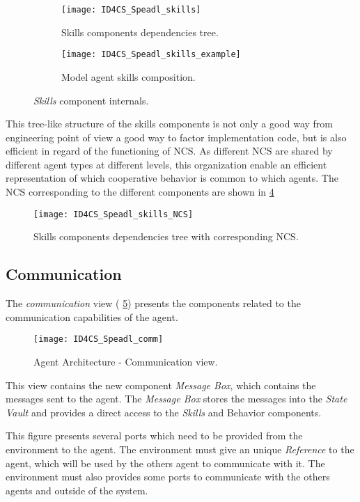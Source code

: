 \begin{figure}[]
\centering
	\begin{subfigure}[b]{0.49\textwidth}
			\texttt{[image: ID4CS\_Speadl\_skills]}
			\caption{Skills components dependencies tree.}\label{skills:graph}
	\end{subfigure}
	\begin{subfigure}[b]{0.49\textwidth}
			\texttt{[image: ID4CS\_Speadl\_skills\_example]}
			\caption{Model agent skills composition.}\label{skills:example}
	\end{subfigure}
\caption{\emph{Skills} component internals.}\label{skills}
\end{figure}

This tree-like structure of the skills components is not only a good way from engineering point of view a good way to factor implementation code, but is also efficient in regard of the functioning of NCS. As different NCS are shared by different agent types at different levels, this organization enable an efficient representation of which cooperative behavior is common to which agents. The NCS corresponding to the different components are shown in \figurename{} \ref{skills:NCS}

\begin{figure}
\centering
\texttt{[image: ID4CS\_Speadl\_skills\_NCS]}
\caption{Skills components dependencies tree with corresponding NCS.}\label{skills:NCS}
\end{figure}

\subsection{Communication}

The \emph{communication} view (\figurename{} \ref{Arch-comm}) presents the components related to the communication capabilities of the agent. 

\begin{figure}
\centering
\texttt{[image: ID4CS\_Speadl\_comm]}
\caption{Agent Architecture - Communication view.}
\label{Arch-comm}
\end{figure}

This view contains the new component \emph{Message Box}, which contains the messages sent to the agent. The \emph{Message Box} stores the messages into the \emph{State Vault} and provides a direct access to the \emph{Skills} and {Behavior} components.

This figure presents several ports which need to be provided from the environment to the agent. The environment must give an unique \emph{Reference} to the agent, which will be used by the others agent to communicate with it. The environment must also provides some ports to communicate with the others agents and outside of the system.

